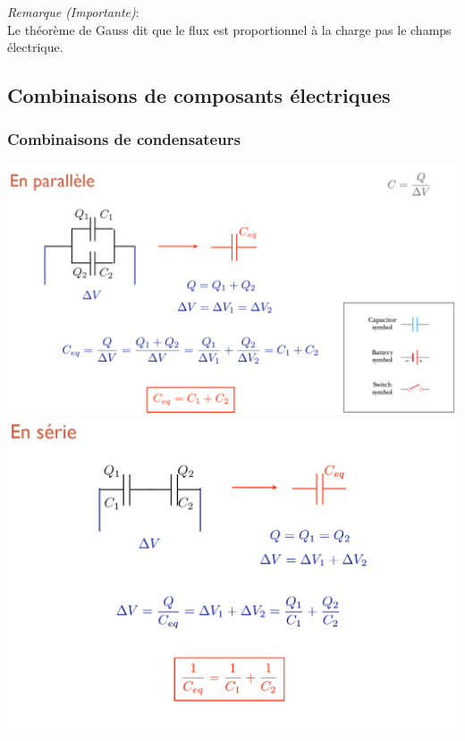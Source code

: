 \documentclass[a4paper]{article}
\begin{document}
\emph{Remarque (Importante)}: \\
Le théorème de Gauss dit que le flux est proportionnel à la charge pas le champs électrique.















\subsection{Combinaisons de composants électriques}







\subsubsection{Combinaisons de condensateurs}






\begin{center}

\includegraphics[width=\textwidth]{CondP.PNG}
\includegraphics[width=\textwidth]{CondS.PNG}

\end{center}
\end{document}
